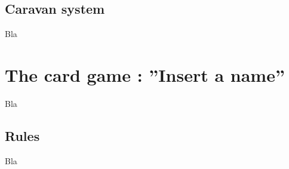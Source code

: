 \documentclass[a4paper,12pt]{book}
\begin{document}
\section{Caravan system}
Bla
\chapter{The card game : ''Insert a name''}
Bla
\section{Rules}
Bla
\end{document}
